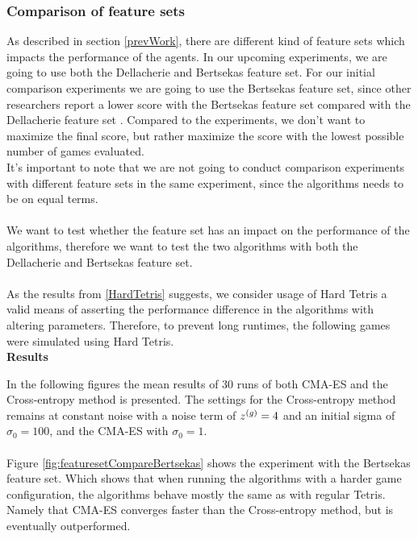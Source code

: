 \subsubsection{Comparison of feature sets  \label{compoffeatureset}}
As described in section \ref{prevWork}, there are different kind of feature sets which
impacts the performance of the agents. In our upcoming experiments, we are going to
use both the Dellacherie and Bertsekas feature set. For our initial comparison experiments
we are going to use the Bertsekas feature set, since other researchers report
a lower score with the Bertsekas feature set compared with the Dellacherie feature set
\citep{scherrer2009}. Compared to the \citep{scherrer2009} experiments, we don't want to maximize the
final score, but rather maximize the score with the lowest possible number of 
games evaluated.\\
It's important to note that we are not going to conduct comparison experiments with different
feature sets in the same experiment, since the algorithms needs to be on equal terms.\\
\\
We want to test whether the feature set has an impact on the performance of the algorithms,
therefore we want to test the two algorithms with both the Dellacherie and Bertsekas feature set.\\
\\
As the results from \ref{HardTetris} suggests, we consider usage of Hard Tetris \citep{boumaza2009} a valid means of asserting the performance difference in the algorithms with altering parameters.
Therefore, to prevent long runtimes, the following games were simulated
using Hard Tetris.\\

\textbf{Results}

In the following figures the mean results of 30 runs of both CMA-ES and the Cross-entropy method is presented. The settings for the Cross-entropy method remains at constant noise
with a noise term of $z^{(g)} = 4$ and an initial sigma of $\sigma_0 = 100$, 
and the CMA-ES with $\sigma_0 = 1$.\\
\\
Figure \ref{fig:featuresetCompareBertsekas} shows the experiment with the 
Bertsekas feature set. Which shows that when running the algorithms with a
harder game configuration, the algorithms behave mostly the same as with regular 
Tetris. Namely that CMA-ES converges faster than the Cross-entropy method, 
but is eventually outperformed.

